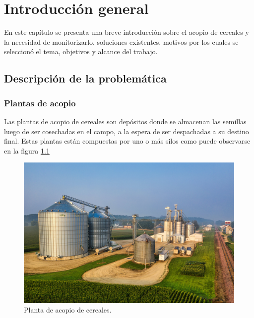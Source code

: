 
\chapter{Introducción general} %

\label{Chapter1} %
\label{IntroGeneral}


\newcommand{\keyword}[1]{\textbf{#1}}
\newcommand{\tabhead}[1]{\textbf{#1}}
\newcommand{\code}[1]{\texttt{#1}}
\newcommand{\file}[1]{\texttt{\bfseries#1}}
\newcommand{\option}[1]{\texttt{\itshape#1}}
\newcommand{\grados}{$^{\circ}$}


En este capítulo se presenta una breve introducción sobre el acopio de cereales y la necesidad de monitorizarlo, soluciones existentes, motivos por los cuales se seleccionó el tema, objetivos y alcance del trabajo. 
\section{Descripción de la problemática}

\subsection{Plantas de acopio}

Las plantas de acopio de cereales son depósitos donde se almacenan las semillas luego de ser cosechadas en el campo, a la espera de ser despachadas a su destino final. Estas plantas están compuestas por uno o más silos como puede observarse en la figura \ref{fig:planta}

\begin{figure}[htbp]
	\centering
	\includegraphics[width=.5\textwidth]{./Figures/PlantaAcopio.jpg}
	\caption{Planta de acopio de cereales.\protect\footnotemark}
	\label{fig:planta}
\end{figure}

